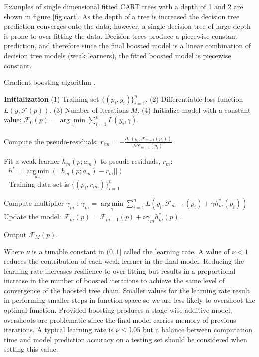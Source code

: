 Examples of single dimensional fitted CART trees with a depth of 1 and 2 are shown in figure \ref{fig:cart}.  As the depth of a tree is increased the decision tree prediction converges onto the data; however, a single decision tree of large depth is prone to over fitting the data.  Decision trees produce a piecewise constant prediction, and therefore since the final boosted model is a linear combination of decision tree models (weak learners), the fitted boosted model is piecewise constant.

\begin{algorithm}[H]
    \caption{Gradient boosting algorithm \cite{friedman2002}.}
    \begin{algorithmic}[1]
    \STATE \textbf{Initialization}
    \STATE (1) Training set $\{(p_i, y_i)\}_{i=1}^n$.
    \STATE (2) Differentiable loss function $L(y, \mathcal F(p))$.
    \STATE (3) Number of iterations ${{M}}$.
    \STATE (4)   Initialize model with a constant value:
        $\mathcal F_0(p) = \underset{\gamma}{\arg\min} \sum_{i=1}^n L(y_i, \gamma).$

        \STATE Compute the pseudo-residuals:
            \STATE $r_{im} = -\frac{\partial L(y_i, \mathcal F_{m-1}(p_i))}{\partial \mathcal F_{m-1}(p_i)}$
        \ENDFOR

        \STATE Fit a weak learner $h_m(p; a_m)$ to pseudo-residuals, $r_{m}$: \\
            $\ \ \ h^* = \underset{a_m}{\operatorname{arg\,min}}(||h_m(p; a_m) - r_m||)$ \\
            $\ \ $ Training data set is $\{(p_i, r_{im})\}_{i=1}^n$ \;

        \STATE Compute multiplier $\gamma_m$ :
        $\gamma_m = \underset{\gamma}{\operatorname{arg\,min}} \sum_{i=1}^n L\left(y_i, \mathcal F_{m-1}(p_i) + \gamma h^*_m(p_i)\right)$\;
        \STATE Update the model:
        $\mathcal F_m(p) = \mathcal F_{m-1}(p) + \nu \gamma_m h^*_m(p).$

    \ENDFOR
    \STATE Output $\mathcal F_M(p).$
    \end{algorithmic}
\label{alg:boosting}
\end{algorithm}

Where $\nu$ is a tunable constant in $(0, 1]$ called the learning rate.  A value of $\nu < 1$ reduces the contribution of each weak learner in the final model.  Reducing the learning rate increases resilience to over fitting but results in a proportional increase in the number of boosted iterations to achieve the same level of convergence of the boosted tree chain.  Smaller values for the learning rate result in performing smaller steps in function space so we are less likely to overshoot the optimal function. Provided boosting produces a stage-wise additive model, overshoots are problematic since the final model carries memory of previous iterations.  A typical learning rate is $\nu\leq 0.05$ but a balance between computation time and model prediction accuracy on a testing set should be considered when setting this value.

